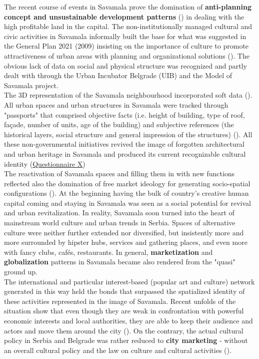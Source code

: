 \documentclass[11pt]{report}
\begin{document}
The recent course of events in Savamala prove the domination of \textbf{anti-planning concept and unsustainable development patterns} (\href{ref}{\citealt{vujosevic_postsocijalisticka_2010}}) in dealing with the high profitable land in the capital.
The non-institutionally managed cultural and civic activities in Savamala informally built the base for what was suggested in the General Plan 2021 (2009) insisting on the importance of culture to promote attractiveness of urban areas with planning and organizational solutions (\cite{GPXXX}).
The obvious lack of data on social and physical structure was recognized and partly dealt with through the Urban Incubator Belgrade (UIB) and the Model of Savamala project.
\\

The 3D representation of the Savamala neighbourhood incorporated soft data (\href{ref}{\citealt{cvetinovic_engine_2013}}).
All urban spaces and urban structures in Savamala were tracked through "passports" that comprised objective facts (i.e. height of building, type of roof, façade, number of units, age of the building) and subjective references (the historical layers, social structure and general impression of the structures) (\href{ref}{\citealt{lee_yaniya_model_2013}}).
All these non-governmental initiatives revived the image of forgotten architectural and urban heritage in Savamala and produced its current recognizable cultural identity
(\href{Questionnaire PhD Savamala}{Questionnaire X})
\\

The reactivation of Savamala spaces and filling them in with new functions reflected also the domination of free market ideology for generating socio-spatial configurations (\href{ref}{\citealt{world_bank_cities_2000}}). 
At the beginning having the bulk of country's creative human capital coming and staying in Savamala was seen as a social potential for revival and urban revitalization.
In reality, Savamala soon turned into the heart of mainstream world culture and urban trends in Serbia.
Spaces of alternative culture were neither further extended nor diversified, but insistently more and more surrounded by hipster hubs, services and gathering places, and even more with fancy clubs, cafés, restaurants.
In general, \textbf{marketization} and \textbf{globalization} patterns in Savamala became also rendered from the "quasi" ground up.
\\

The international and particular interest-based (popular art and culture) network generated in this way held the bonds that surpassed the spatialized identity of these activities represented in the image of Savamala. Recent unfolds of the situation show that even though they are weak in confrontation with powerful economic interests and local authorities, they are able to keep their audience and actors and move them around the city (\cite{media}).
On the contrary, the actual cultural policy in Serbia and Belgrade was rather reduced to \textbf{city marketing} - without an overall cultural policy and the law on culture and cultural activities (\href{ref}{\citealt{volic_belgrade_2012}}).
\\
\end{document}
